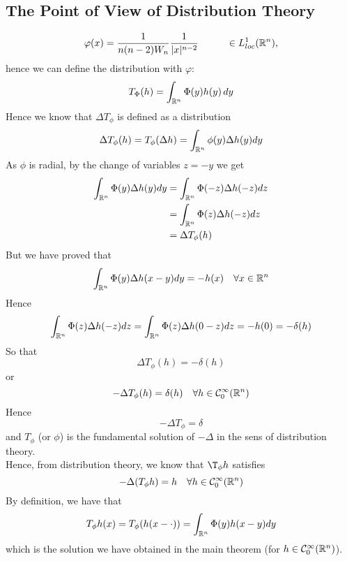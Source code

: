 \subsection{The Point of View of Distribution Theory}
\begin{equation*}
    \varphi (x)= \frac{1}{n(n-2) W_n}\frac{1}{|x|^{n-2}} \hspace{1 cm} \in L_{loc}^1(\mathbb{R}^n),
\end{equation*}
hence we can define the distribution with $\varphi$:
\begin{equation*}
    T_{\Phi}(h)= \int_{\mathbb{R}^n} \Phi (y) h(y) \, dy 
\end{equation*}
Hence we know that $\Delta T_\phi$ is defined as a distribution
\begin{equation*}
    \Delta T_\phi(h) = T_\phi (\Delta h) = \int_{\mathbb{R}^n} \phi(y) \Delta h(y) dy
\end{equation*}
As $\phi$ is radial, by the change of variables $z = -y$ we get
\begin{align*}
    \int_{\mathbb{R}^n} \Phi(y) \Delta h(y)dy &= \int_{\mathbb{R}^n} \Phi(-z) \Delta h(-z) dz \\
    &= \int_{\mathbb{R}^n} \Phi(z) \Delta h(-z) dz \\
    &= \Delta T_\phi(h)
\end{align*}
But we have proved that 
\begin{equation*}
    \int_{\mathbb{R}^n} \Phi(y) \Delta h(x-y)dy = -h(x) \quad \forall x \in \mathbb{R}^n
\end{equation*}
Hence
\begin{equation*}
    \int_{\mathbb{R}^n} \Phi(z) \Delta h(-z)dz = \int_{\mathbb{R}^n} \Phi(z) \Delta h(0-z)dz = -h(0) = - \delta (h)
\end{equation*}
So that 
\begin{equation*}
    \Delta T_\phi(h) = -\delta(h)
\end{equation*}
or 
\begin{equation*}
    -\Delta T_\phi(h) = \delta(h) \quad \forall h \in \mathcal{C}^\infty_0 (\mathbb{R}^n)
\end{equation*}
Hence
\begin{equation*}
    -\Delta T_\phi = \delta
\end{equation*}
and $T_\phi$ (or $\phi$) is the fundamental solution of $-\Delta$ in the sens of distribution theory. \\
Hence, from distribution theory, we know that $\T_\phi \* h$ satisfies 
\begin{equation*}
    -\Delta (T_\phi \* h) = h \quad \forall h \in \mathcal{C}^\infty_0 (\mR^n)
\end{equation*}
By definition, we have that 
\begin{equation*}
    T_\phi \* h(x) = T_\phi(h(x-\cdot)) = \int_{\mR^n} \Phi(y) h(x-y) dy
\end{equation*}
which is the solution we have obtained in the main theorem (for $h \in \mathcal{C}^\infty_0(\mathbb{R}^n)$). 
